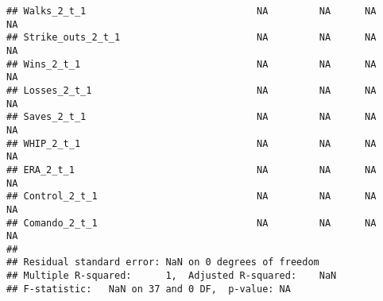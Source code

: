 \documentclass[
]{article}
\begin{document}
\begin{verbatim}
## Walks_2_t_1                              NA         NA      NA       NA
## Strike_outs_2_t_1                        NA         NA      NA       NA
## Wins_2_t_1                               NA         NA      NA       NA
## Losses_2_t_1                             NA         NA      NA       NA
## Saves_2_t_1                              NA         NA      NA       NA
## WHIP_2_t_1                               NA         NA      NA       NA
## ERA_2_t_1                                NA         NA      NA       NA
## Control_2_t_1                            NA         NA      NA       NA
## Comando_2_t_1                            NA         NA      NA       NA
## 
## Residual standard error: NaN on 0 degrees of freedom
## Multiple R-squared:      1,  Adjusted R-squared:    NaN 
## F-statistic:   NaN on 37 and 0 DF,  p-value: NA
\end{verbatim}
\end{document}
